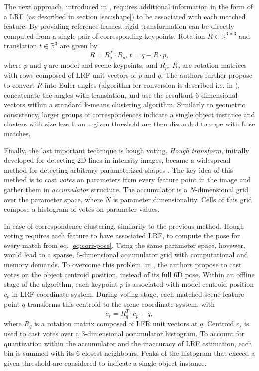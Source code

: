 The next approach, introduced in \cite{poseClustering}, requires additional information in the form of a LRF (as described in section \ref{sec:shape}) to be associated with each matched feature. By providing reference frames, rigid transformation can be directly computed from a single pair of corresponding keypoints. Rotation $R \in \mathbb{R}^{3\times 3}$ and translation $t \in \mathbb{R}^3$ are given by
\begin{equation}
R = R_q^T \cdot R_p,\ t = q - R\cdot p,
\label{eq:corr-pose}
\end{equation}
where $p$ and $q$ are model and scene keypoints, and $R_p$, $R_q$ are rotation matrices with rows composed of LRF unit vectors of $p$ and $q$. The authors further propose to convert $R$ into Euler angles (algorithm for conversion is described i.e. in \cite{rotationToEuler}), concatenate the angles with translation, and use the resultant 6-dimensional vectors within a standard k-means clustering algorithm. Similarly to geometric consistency, larger groups of correspondences indicate a single object instance and clusters with size less than a given threshold are then discarded to cope with false matches.

Finally, the last important technique is hough voting. \textit{Hough transform}, initially developed for detecting 2D lines in intensity images, became a widespread method for detecting arbitrary parameterized shapes \cite{generalizedHough}. The key idea of this method is to cast \textit{votes} on parameters from every feature point in the image and gather them in \textit{accumulator} structure. The accumulator is a $N$-dimensional grid over the parameter space, where $N$ is parameter dimensionality. Cells of this grid compose a histogram of votes on parameter values.

In case of correspondence clustering, similarily to the previous method, Hough voting requires each feature to have associated LRF, to compute the pose for every match from eq. \ref{eq:corr-pose}. Using the same parameter space, hovewer, would lead to a sparse, 6-dimensional accumulator grid with computational and memory demands. To overcome this problem, in \cite{hough}, the authors propose to cast votes on the object centroid position, instead of its full 6D pose. Within an offline stage of the algorithm, each keypoint $p$ is associated with model centroid position $c_p$ in LRF coordinate system. During voting stage, each matched scene feature point $q$ transforms this centroid to the scene coordinate system, with
\begin{equation}
c_s = R_q^T \cdot c_p + q,
\end{equation}
where $R_q$ is a rotation matrix composed of LFR unit vectors at $q$. Centroid $c_s$ is used to cast votes over a 3-dimensional accumulator histogram. To account for quantization within the accumulator and the inaccuracy of LRF estimation, each bin is summed with its 6 closest neighbours. Peaks of the histogram that exceed a given threshold are considered to indicate a single object instance.


